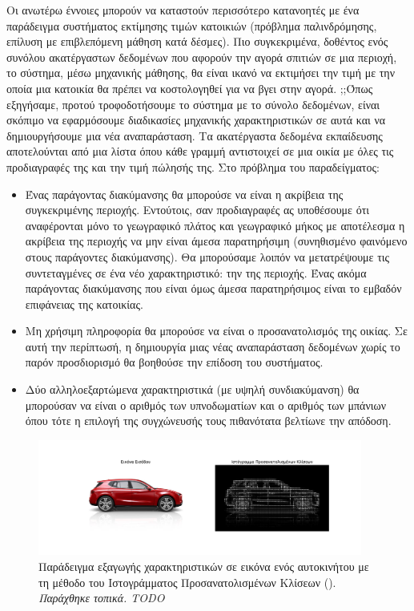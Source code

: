 Οι ανωτέρω έννοιες μπορούν να καταστούν περισσότερο κατανοητές με ένα παράδειγμα συστήματος εκτίμησης τιμών κατοικιών\cite{geron2019hands} (πρόβλημα παλινδρόμησης, επίλυση με επιβλεπόμενη μάθηση κατά δέσμες). Πιο συγκεκριμένα, δοθέντος ενός συνόλου ακατέργαστων δεδομένων που αφορούν την αγορά σπιτιών σε μια περιοχή, το σύστημα, μέσω μηχανικής μάθησης, θα είναι ικανό να εκτιμήσει την τιμή με την οποία μια κατοικία θα πρέπει να κοστολογηθεί για να βγει στην αγορά. ;;Όπως εξηγήσαμε, προτού τροφοδοτήσουμε το σύστημα με το σύνολο δεδομένων, είναι σκόπιμο να εφαρμόσουμε διαδικασίες μηχανικής χαρακτηριστικών σε αυτά και να δημιουργήσουμε μια νέα αναπαράσταση. Τα ακατέργαστα δεδομένα εκπαίδευσης αποτελούνται από μια λίστα όπου κάθε γραμμή αντιστοιχεί σε μια οικία με όλες τις προδιαγραφές της και την τιμή πώλησής της. Στο πρόβλημα του παραδείγματος:
\begin{itemize}
    \item  Ένας παράγοντας διακύμανσης θα μπορούσε να είναι η ακρίβεια της συγκεκριμένης περιοχής. Εντούτοις, σαν προδιαγραφές ας υποθέσουμε ότι αναφέρονται μόνο το γεωγραφικό πλάτος και γεωγραφικό μήκος με αποτέλεσμα η ακρίβεια της περιοχής να μην είναι άμεσα παρατηρήσιμη (συνηθισμένο φαινόμενο στους παράγοντες διακύμανσης). Θα μπορούσαμε λοιπόν να μετατρέψουμε τις συντεταγμένες σε ένα νέο χαρακτηριστικό: την  της περιοχής. Ένας ακόμα παράγοντας διακύμανσης που είναι όμως άμεσα παρατηρήσιμος είναι το εμβαδόν επιφάνειας της κατοικίας.
 \item Μη χρήσιμη πληροφορία θα μπορούσε να είναι ο προσανατολισμός της οικίας. Σε αυτή την περίπτωσή, η δημιουργία μιας νέας αναπαράσταση δεδομένων χωρίς το παρόν προσδιορισμό θα βοηθούσε την επίδοση του συστήματος. 
 \item Δύο αλληλοεξαρτώμενα χαρακτηριστικά (με υψηλή συν\textemdash διακύμανση) θα μπορούσαν να είναι ο αριθμός των υπνοδωματίων και ο αριθμός των μπάνιων όπου τότε η επιλογή της συγχώνευσής τους πιθανότατα βελτίωνε την απόδοση. 
\end{itemize}
\par

\begin{figure}[h]
  \centering
  \includegraphics[width=0.95\textwidth]{images/chapter theoritical background/hog_gr.pdf}
  \caption{Παράδειγμα εξαγωγής χαρακτηριστικών σε εικόνα ενός αυτοκινήτου με τη μέθοδο του Ιστογράμματος Προσανατολισμένων Κλίσεων (). \textit{Παράχθηκε τοπικά. TODO}} 
  \label{fig:_hog}
\end{figure}

